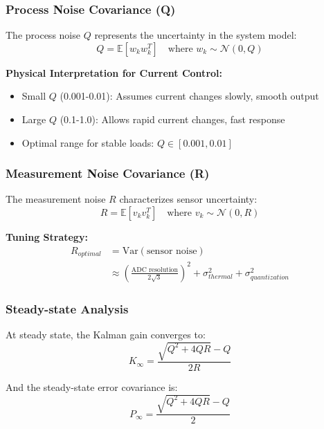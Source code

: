 \documentclass{article}
\begin{document}
\subsubsection{Process Noise Covariance (Q)}

The process noise $Q$ represents the uncertainty in the system model:
\begin{equation}
Q = \mathbb{E}[w_k w_k^T] \quad \text{where } w_k \sim \mathcal{N}(0, Q)
\end{equation}

\textbf{Physical Interpretation for Current Control:}
\begin{itemize}
    \item Small $Q$ (0.001-0.01): Assumes current changes slowly, smooth output
    \item Large $Q$ (0.1-1.0): Allows rapid current changes, fast response
    \item Optimal range for stable loads: $Q \in [0.001, 0.01]$
\end{itemize}

\subsubsection{Measurement Noise Covariance (R)}

The measurement noise $R$ characterizes sensor uncertainty:
\begin{equation}
R = \mathbb{E}[v_k v_k^T] \quad \text{where } v_k \sim \mathcal{N}(0, R)
\end{equation}

\textbf{Tuning Strategy:}
\begin{align}
R_{optimal} &= \text{Var}(\text{sensor noise}) \\
&\approx \left(\frac{\text{ADC resolution}}{2\sqrt{3}}\right)^2 + \sigma_{thermal}^2 + \sigma_{quantization}^2
\end{align}

\subsubsection{Steady-state Analysis}

At steady state, the Kalman gain converges to:
\begin{equation}
K_{\infty} = \frac{\sqrt{Q^2 + 4QR} - Q}{2R}
\end{equation}

And the steady-state error covariance is:
\begin{equation}
P_{\infty} = \frac{\sqrt{Q^2 + 4QR} - Q}{2}
\end{equation}
\end{document}
